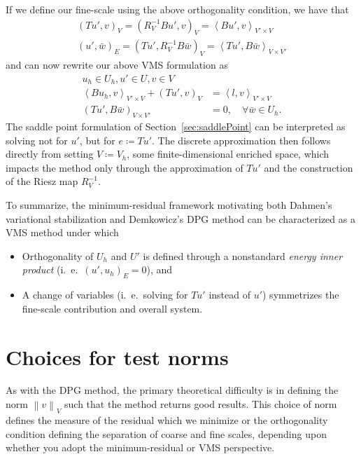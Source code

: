 \documentclass[final,leqno]{siamltex}
\newcommand{\nor}[1]{\left\| #1 \right\|}
\newcommand{\LRp}[1]{\left( #1 \right)}
\newcommand{\LRa}[1]{\left\langle #1 \right\rangle}
\begin{document}
If we define our fine-scale using the above orthogonality condition, we have that
\begin{align*}
\LRp{Tu',v}_V = \LRp{R_V^{-1}Bu',v}_V = \LRa{Bu',v}_{V'\times V}\\
\LRp{u',\bar{w}}_E = \LRp{Tu',R_V^{-1}B\bar{w}}_V = \LRa{Tu',B\bar{w}}_{V\times V'}
\end{align*}
and can now rewrite our above VMS formulation as 
\begin{align*}
u_h \in U_h, u' \in U, v \in V\\
\LRa{Bu_h,v}_{V'\times V} + \LRp{Tu',v}_{V} &= \LRa{l,v}_{V'\times V}\\
\LRp{Tu',B\bar{w}}_{V\times V'} &= 0, \quad \forall \bar{w} \in U_h.
\end{align*}
The saddle point formulation of Section~\ref{sec:saddlePoint} can be interpreted as solving not for $u'$, but for $e\coloneqq Tu'$.  The discrete approximation then follows directly from setting $V \coloneqq V_h$, some finite-dimensional enriched space, which impacts the method only through the approximation of $Tu'$ and the construction of the Riesz map $R_V^{-1}$.  

To summarize, the minimum-residual framework motivating both Dahmen's variational stabilization and Demkowicz's DPG method can be characterized as a VMS method under which 
\begin{itemize}
\item Orthogonality of $U_h$ and $U'$ is defined through a nonstandard \textit{energy inner product} (i.\ e.\ $\LRp{u',u_h}_E = 0$), and
\item A change of variables (i.\ e.\ solving for $Tu'$ instead of $u'$) symmetrizes the fine-scale contribution and overall system.
\end{itemize}

\section{Choices for test norms}

As with the DPG method, the primary theoretical difficulty is in defining the norm $\nor{v}_V$ such that the method returns good results.  This choice of norm defines the measure of the residual which we minimize or the orthogonality condition defining the separation of coarse and fine scales, depending upon whether you adopt the minimum-residual or VMS perspective.  
\end{document}
